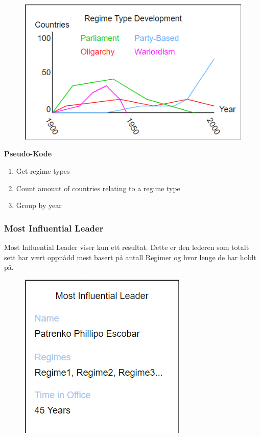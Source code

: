 \FigureCounter
\begin{figure}[H]
  \includegraphics[scale=1]{images/milepael4/regimeTypeDevelopment.png}
\end{figure}

\textbf{Pseudo-Kode}
\begin{enumerate}
  \item Get regime types
  \item Count amount of countries relating to a regime type
  \item Group by year
\end{enumerate}

\subsubsection{Most Influential Leader}
Most Influential Leader viser kun ett resultat. Dette er den lederen som totalt sett har vært oppnådd 
mest basert på antall Regimer og hvor lenge de har holdt på.


\FigureCounter
\begin{figure}[H]
  \includegraphics[scale=1]{images/milepael4/mostInfluentialLeader.png}
\end{figure}

